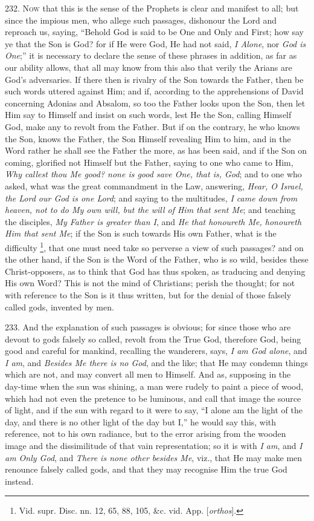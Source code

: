 232. N\textsc{ow} that
this is the sense of the Prophets is clear and manifest to all; but
since the impious men, who allege such passages, dishonour the Lord
and reproach us, saying, ``Behold God is said to be One and Only and
First; how say ye that the Son is God? for if He were God, He had not
said, \emph{I Alone}, nor \emph{God is One};'' it is necessary to
declare the sense of these phrases in addition, as far as our ability
allows, that all may know from this also that verily the Arians are
God's adversaries. If there then is rivalry of the Son towards the
Father, then be such words uttered against Him; and if, according to
the apprehensions of David concerning Adonias and Absalom, so too the
Father looks upon the Son, then let Him say to Himself and insist on
such words, lest He the Son, calling Himself God, make any to revolt
from the Father. But if on the contrary, he who knows the Son, knows
the Father, the Son Himself revealing Him to him, and in the Word
rather he shall see the Father the more, as has been said, and if the
Son on coming, glorified not Himself but the Father, saying to one who
came to Him, \emph{Why callest thou Me good? none is good save One, that
is, God}; and to one who asked, what was the great commandment in
the Law, answering, \emph{Hear, O Israel, the Lord our God is one Lord};
and saying to the multitudes, \emph{I came down from heaven, not to do My
own will, but the will of Him that sent Me}; and teaching the
disciples, \emph{My Father is greater than I}, and \emph{He that
honoureth Me, honoureth Him that sent Me}; if the Son is such
towards His own Father, what is the difficulty \footnote{Vid. supr. Disc. nn. 12, 65, 88, 105, \&c. vid. App. [\emph{orthos}].}, that one must need take so perverse a view of such passages?
and on the other hand, if the Son is the Word of the Father, who
is so wild, besides these Christ-opposers, as to think that God has
thus spoken, as traducing and denying His own Word? This is not the
mind of Christians; perish the thought; for not with reference to the
Son is it thus written, but for the denial of those falsely called
gods, invented by men.

233. And the explanation of such
passages is obvious; for since those who are devout to gods falsely so
called, revolt from the True God, therefore God, being good and
careful for mankind, recalling the wanderers, says, \emph{I am God alone},
and \emph{I am}, and \emph{Besides Me there is no God}, and the like;
that He may condemn things which are not, and may convert all men to
Himself. And as, supposing in the day-time when the sun was shining, a
man were rudely to paint a piece of wood, which had not even the
pretence to be luminous, and call that image the source of light, and
if the sun with regard to it were to say, ``I alone am the light of the
day, and there is no other light of the day but I,'' he would say this,
with reference, not to his own radiance, but to the error arising from
the wooden image and the dissimilitude of that vain representation; so
it is with \emph{I am}, and \emph{I am Only God}, and \emph{There is none
other besides Me}, viz., that He may make men renounce falsely
called gods, and that they may recognise Him the true God instead.


